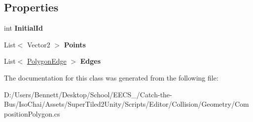 \subsection*{Properties}
\begin{DoxyCompactItemize}
\item 
\mbox{\label{class_super_tiled2_unity_1_1_editor_1_1_geometry_1_1_composition_polygon_af3a0af59135dd5da998c2b24906203dd}} 
int {\bfseries Initial\+Id}
\item 
\mbox{\label{class_super_tiled2_unity_1_1_editor_1_1_geometry_1_1_composition_polygon_acafacb9eb2a715f9c4cd25a2711dc881}} 
List$<$ Vector2 $>$ {\bfseries Points}
\item 
\mbox{\label{class_super_tiled2_unity_1_1_editor_1_1_geometry_1_1_composition_polygon_a1e511b8c856f9d67190e29e75f7ff9a9}} 
List$<$ \mbox{\hyperlink{class_super_tiled2_unity_1_1_editor_1_1_geometry_1_1_polygon_edge}{Polygon\+Edge}} $>$ {\bfseries Edges}
\end{DoxyCompactItemize}


The documentation for this class was generated from the following file\+:\begin{DoxyCompactItemize}
\item 
D\+:/\+Users/\+Bennett/\+Desktop/\+School/\+E\+E\+C\+S\+\_/\+Catch-\/the-\/\+Bus/\+Iso\+Chai/\+Assets/\+Super\+Tiled2\+Unity/\+Scripts/\+Editor/\+Collision/\+Geometry/Composition\+Polygon.\+cs\end{DoxyCompactItemize}
